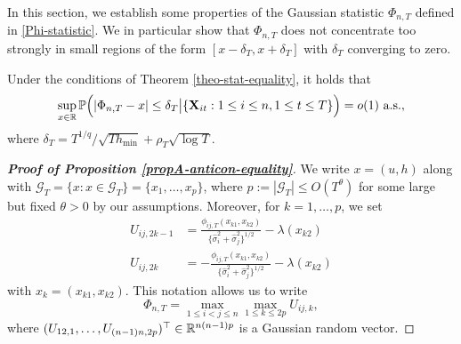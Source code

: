\documentclass[a4paper,12pt]{article}
\begin{document}
In this section, we establish some properties of the Gaussian statistic $\Phi_{n,T}$ defined in \eqref{Phi-statistic}. We in particular show that $\Phi_{n,T}$ does not concentrate too strongly in small regions of the form $[x-\delta_T,x+\delta_T]$ with $\delta_T$ converging to zero.  
%
%
\begin{propA}\label{propA-anticon-equality}
Under the conditions of Theorem \ref{theo-stat-equality}, it holds that 
\[ \sup_{x \in \mathbb{R}} \mathbb{P} \Big( | \Phi_{n,T} - x | \le \delta_T \big| \{\mathbf{X}_{it}: 1\le i \le n, 1 \le t \le T \} \Big) = o(1) \text{ a.s.}, \]
where $\delta_T = T^{1/q} / \sqrt{T h_{\min}} + \rho_T \sqrt{\log T}$.
\end{propA}
%
%
\begin{proof}[\textnormal{\textbf{Proof of Proposition \ref{propA-anticon-equality}}}] 

We write $x = (u,h)$ along with $\mathcal{G}_T = \{ x : x \in \mathcal{G}_T \} = \{x_1,\ldots,x_p\}$, where $p := |\mathcal{G}_T| \le O(T^\theta)$ for some large but fixed $\theta > 0$ by our assumptions. Moreover, for $k = 1,\ldots,p$, we set 
\begin{align*}
U_{ij, 2k-1} & = \frac{\phi_{ij, T}(x_{k1},x_{k2})}{\{\widehat{\sigma}_i^2 + \widehat{\sigma}_j^2\}^{1/2}} - \lambda(x_{k2}) \\
U_{ij, 2k} & = -\frac{\phi_{ij, T}(x_{k1},x_{k2})}{\{\widehat{\sigma}_i^2 + \widehat{\sigma}_j^2\}^{1/2}} - \lambda(x_{k2}) 
\end{align*}
with $x_k = (x_{k1},x_{k2})$. This notation allows us to write
\[ \Phi_{n, T} = \max_{1\le i < j \le n} \max_{1 \le k \le 2p} U_{ij, k}, \]
where $(U_{12, 1},\ldots,U_{(n-1)n, 2p})^\top \in \mathbb{R}^{n(n-1)p}$ is a Gaussian random vector.

\end{proof}
\end{document}
